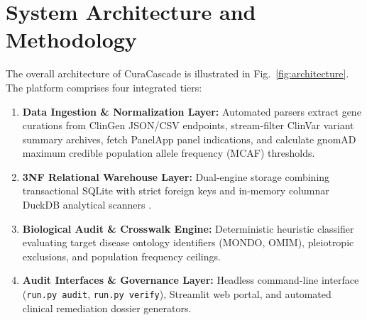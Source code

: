 \documentclass[conference]{IEEEtran}
\begin{document}
\section{System Architecture and Methodology}
The overall architecture of CuraCascade is illustrated in Fig.~\ref{fig:architecture}. The platform comprises four integrated tiers:
\begin{enumerate}
    \item \textbf{Data Ingestion \& Normalization Layer:} Automated parsers extract gene curations from ClinGen JSON/CSV endpoints, stream-filter ClinVar variant summary archives, fetch PanelApp panel indications, and calculate gnomAD maximum credible population allele frequency (MCAF) thresholds.
    \item \textbf{3NF Relational Warehouse Layer:} Dual-engine storage combining transactional SQLite with strict foreign keys and in-memory columnar DuckDB analytical scanners \cite{raasveldt2019duckdb}.
    \item \textbf{Biological Audit \& Crosswalk Engine:} Deterministic heuristic classifier evaluating target disease ontology identifiers (MONDO, OMIM), pleiotropic exclusions, and population frequency ceilings.
    \item \textbf{Audit Interfaces \& Governance Layer:} Headless command-line interface (\texttt{run.py audit}, \texttt{run.py verify}), Streamlit web portal, and automated clinical remediation dossier generators.
\end{enumerate}
\end{document}
